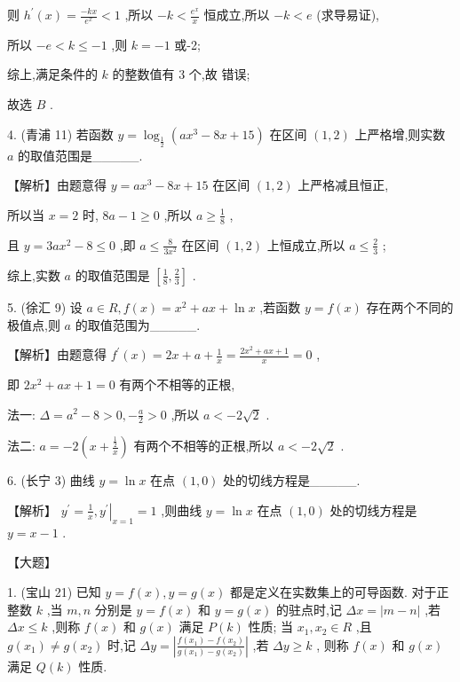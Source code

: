 \documentclass[10pt]{article}
\newcommand*\circled[1]{\tikz[baseline=(char.base)]{\node[shape=circle,draw,inner sep=1.5pt] (char) {\small #1};}}
\begin{document}
则 \({h}^{\prime }\left( x\right)  = \frac{-{kx}}{{e}^{x}} < 1\) ,所以 \(- k < \frac{{e}^{x}}{x}\) 恒成立,所以 \(- k < e\) (求导易证),

所以 \(- e < k \leq   - 1\) ,则 \(k =  - 1\) 或-2;

综上,满足条件的 \(k\) 的整数值有 3 个,故 \circled{2} 错误;

故选 \(B\) .

4. (青浦 11) 若函数 \(y = {\log }_{\frac{1}{2}}\left( {a{x}^{3} - {8x} + {15}}\right)\) 在区间 \(\left( {1,2}\right)\) 上严格增,则实数 \(a\) 的取值范围是\_\_\_\_\_.

【解析】由题意得 \(y = a{x}^{3} - {8x} + {15}\) 在区间 \(\left( {1,2}\right)\) 上严格减且恒正,

所以当 \(x = 2\) 时, \({8a} - 1 \geq  0\) ,所以 \(a \geq  \frac{1}{8}\) ,

且 \(y = {3a}{x}^{2} - 8 \leq  0\) ,即 \(a \leq  \frac{8}{3{x}^{2}}\) 在区间 \(\left( {1,2}\right)\) 上恒成立,所以 \(a \leq  \frac{2}{3}\) ;

综上,实数 \(a\) 的取值范围是 \(\left\lbrack  {\frac{1}{8},\frac{2}{3}}\right\rbrack\) .

5. (徐汇 9) 设 \(a \in  R,f\left( x\right)  = {x}^{2} + {ax} + \ln x\) ,若函数 \(y = f\left( x\right)\) 存在两个不同的极值点,则 \(a\) 的取值范围为\_\_\_\_\_.

【解析】由题意得 \({f}^{\prime }\left( x\right)  = {2x} + a + \frac{1}{x} = \frac{2{x}^{2} + {ax} + 1}{x} = 0\) ,

即 \(2{x}^{2} + {ax} + 1 = 0\) 有两个不相等的正根,

法一: \(\Delta  = {a}^{2} - 8 > 0, - \frac{a}{2} > 0\) ,所以 \(a <  - 2\sqrt{2}\) .

法二: \(a =  - 2\left( {x + \frac{\frac{1}{2}}{x}}\right)\) 有两个不相等的正根,所以 \(a <  - 2\sqrt{2}\) .

6. (长宁 3) 曲线 \(y = \ln x\) 在点 \(\left( {1,0}\right)\) 处的切线方程是\_\_\_\_\_.

【解析】 \({y}^{\prime } = {\left. \frac{1}{x},{y}^{\prime }\right| }_{x = 1} = 1\) ,则曲线 \(y = \ln x\) 在点 \(\left( {1,0}\right)\) 处的切线方程是 \(y = x - 1\) .

【大题】

1. (宝山 21) 已知 \(y = f\left( x\right) ,y = g\left( x\right)\) 都是定义在实数集上的可导函数. 对于正整数 \(k\) ,当 \(m,n\) 分别是 \(y = f\left( x\right)\) 和 \(y = g\left( x\right)\) 的驻点时,记 \({\Delta x} = \left| {m - n}\right|\) ,若 \({\Delta x} \leq  k\) ,则称 \(f\left( x\right)\) 和 \(g\left( x\right)\) 满足 \(P\left( k\right)\) 性质; 当 \({x}_{1},{x}_{2} \in  R\) ,且 \(g\left( {x}_{1}\right)  \neq  g\left( {x}_{2}\right)\) 时,记 \({\Delta y} = \left| \frac{f\left( {x}_{1}\right)  - f\left( {x}_{2}\right) }{g\left( {x}_{1}\right)  - g\left( {x}_{2}\right) }\right|\) ,若 \({\Delta y} \geq  k\) , 则称 \(f\left( x\right)\) 和 \(g\left( x\right)\) 满足 \(Q\left( k\right)\) 性质.
\end{document}
